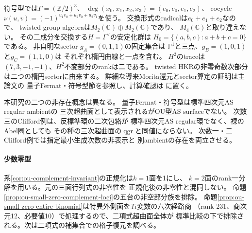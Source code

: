 \documentclass[11pt,a4paper]{ltjsarticle}
\begin{document}
符号型では$\Gamma=(\mathbb Z/2)^3$、
$\deg(x_0,x_1,x_2,x_3)=(e_0,e_0,e_1,e_2)$、
cocycle $\nu(u,v)=(-1)^{u_1v_0+u_2v_0+u_2v_1}$を使う。
交換形式のradicalは$e_0+e_1+e_2$なので、
twisted group algebraは$M_2(\mathbb C)\oplus M_2(\mathbb C)$であり、
$M_4(\mathbb C)$と取り違えない。
その二成分を交換する$H=\Gamma^\vee$の安定化群は
$H_0=\{(a,b,c):a+b+c=0\}$である。
非自明なsector $g_A=(0,1,1)$の固定集合は
$\mathbb P^1$と三点、$g_B=(1,0,1)$と$g_C=(1,1,0)$は
それぞれ楕円曲線と一点を含む。
$H^2$のtraceは$(7,3,-1,-1)$、$H^2$不変部分のrankは二である。
twisted HKRの非零奇数次部分は二つの楕円sectorに由来する。
詳細な導来Morita還元とsector算定の証明は主論文の
量子Fermat・符号型節を参照し、計算確認は
に置く。

本研究の二つの非存在概念は異なる。
量子Fermat・符号型は標準四次元AS regular ambientの
三次超曲面として表示されるがOU型AS surfaceでない。
次数三のClifford例は、反標準環の二次包絡が
標準四次元AS regular環でなく、裸のAbel圏としても
その種の三次超曲面の$\operatorname{qgr}$と同値にならない。
次数一・二Clifford例では指定最小生成次数の非表示と
別ambientの存在を両立させる。



\paragraph{少数零型}
系\ref{cor:ou-complement-invariant}の正規化は$k=1$面を1にし、
$k=2$面のrank一分解を用いる。元の三面行列式の非零性を
正規化後の非零性と混同しない。
命題\ref{prop:ou-small-zero-complement-loci}の五台の非空部分族を排除。
命題\ref{prop:ou-small-zero-entire-binomial}は特異外側面を五変数の六次経路商
（rank 231、商次元12、必要値10）で処理するので、二項式超曲面全体が
標準比較の下で排除される。次は二項式の補集合での格子復元を調べる。
\end{document}
